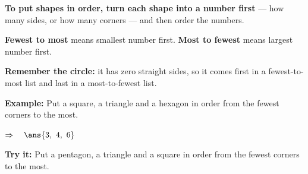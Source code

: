 \documentclass[12pt]{article}
\begin{document}

\begin{formulabox}
\textbf{To put shapes in order, turn each shape into a number first} --- how many sides, or how many corners --- and then order the numbers.\par
\textbf{Fewest to most} means smallest number first. \textbf{Most to fewest} means largest number first.\par
\textbf{Remember the circle:} it has zero straight sides, so it comes first in a fewest-to-most list and last in a most-to-fewest list.
\end{formulabox}

\begin{examplebox}
\textbf{Example:} \quad Put a square, a triangle and a hexagon in order from the fewest corners to the most.

$\Rightarrow\quad \ans{3,\ 4,\ 6}$
\end{examplebox}

\begin{tryitbox}
\textbf{Try it:} \quad Put a pentagon, a triangle and a square in order from the fewest corners to the most.\\[2pt]
\end{tryitbox}
\end{document}
